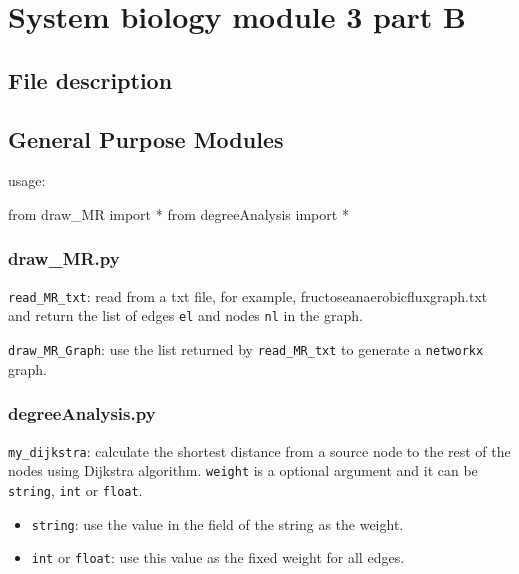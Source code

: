 \documentclass[]{article}
\date{}
\newenvironment{Shaded}{}{}
\newcommand{\ImportTok}[1]{#1}
\newcommand{\OperatorTok}[1]{\textcolor[rgb]{0.40,0.40,0.40}{#1}}
\newcommand{\NormalTok}[1]{#1}
\begin{document}
\hypertarget{header-n0}{%
\section{System biology module 3 part B}\label{header-n0}}

\hypertarget{header-n2}{%
\subsection{File description}\label{header-n2}}

\hypertarget{header-n5}{%
\subsection{General Purpose Modules}\label{header-n5}}

usage:

\begin{Shaded}
\begin{Highlighting}[]
\ImportTok{from}\NormalTok{ draw_MR }\ImportTok{import} \OperatorTok{*}
\ImportTok{from}\NormalTok{ degreeAnalysis }\ImportTok{import} \OperatorTok{*}
\end{Highlighting}
\end{Shaded}

\hypertarget{header-n9}{%
\subsubsection{draw\_MR.py}\label{header-n9}}

\texttt{read\_MR\_txt}: read from a txt file, for example,
fructoseanaerobicfluxgraph.txt and return the list of edges \texttt{el}
and nodes \texttt{nl} in the graph.

\texttt{draw\_MR\_Graph}: use the list returned by
\texttt{read\_MR\_txt} to generate a \texttt{networkx} graph.

\hypertarget{header-n16}{%
\subsubsection{degreeAnalysis.py}\label{header-n16}}

\texttt{my\_dijkstra}: calculate the shortest distance from a source
node to the rest of the nodes using Dijkstra algorithm. \texttt{weight}
is a optional argument and it can be \texttt{string}, \texttt{int} or
\texttt{float}.

\begin{itemize}
\item
  \texttt{string}: use the value in the field of the string as the
  weight.
\item
  \texttt{int} or \texttt{float}: use this value as the fixed weight for
  all edges.
\end{itemize}
\end{document}
